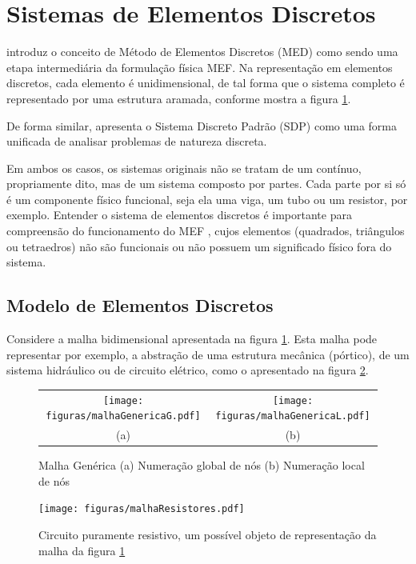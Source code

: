 \documentclass[
    12pt,               %
    openright,          %
    oneside,
    a4paper,            %
    english,            %
    french,             %
    spanish,            %
    brazil              %
    ]{abntex2}
\begin{document}
\section{Sistemas de Elementos Discretos}
\label{sec:SED}

\cite[p. 68]{desai} introduz o conceito de Método de Elementos Discretos (MED) como sendo uma etapa intermediária da formulação física MEF. Na representação em elementos discretos, cada elemento é unidimensional, de tal forma que o sistema completo é representado por uma estrutura aramada, conforme mostra a figura \ref{fig:malhaGenerica}.

De forma similar, \cite[p. 2]{zien} apresenta o Sistema Discreto Padrão (SDP) como uma forma unificada de analisar problemas de natureza discreta.

Em ambos os casos, os sistemas originais não se tratam de um contínuo, propriamente dito, mas de um sistema composto por partes. Cada parte por si só é um componente físico funcional, seja ela uma viga, um tubo ou um resistor, por exemplo. Entender o sistema de elementos discretos é importante para compreensão do funcionamento do MEF \cite[p. 6]{zien}, cujos elementos (quadrados, triângulos ou tetraedros) não são funcionais ou não possuem um significado físico fora do sistema.


\subsection{Modelo de Elementos Discretos}

Considere a malha bidimensional  apresentada na figura \ref{fig:malhaGenerica}. Esta malha pode representar por exemplo, a abstração de uma estrutura mecânica (pórtico), de um sistema hidráulico ou de circuito elétrico, como o apresentado na figura \ref{fig:repMalhaGenerica}.
\begin{figure}[!htb]
\centering
	\begin{tabular}{c c}
		\texttt{[image: figuras/malhaGenericaG.pdf]}	
		&
		\texttt{[image: figuras/malhaGenericaL.pdf]}
		\\
		(a) & (b)
	\end{tabular} 

\caption{Malha Genérica (a) Numeração global de nós (b) Numeração local de nós}
\label{fig:malhaGenerica}
\end{figure}

\begin{figure}[!htb]
\centering
\texttt{[image: figuras/malhaResistores.pdf]}
\caption{Circuito puramente resistivo, um possível objeto de representação da malha da figura \ref{fig:malhaGenerica}}
\label{fig:repMalhaGenerica}
\end{figure}
\end{document}
